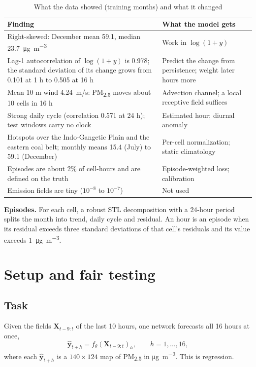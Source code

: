\documentclass[conference]{IEEEtran}
\newcommand{\ugm}{\si{\micro\gram\per\cubic\metre}}
\newcommand{\PM}{PM\textsubscript{2.5}}
\begin{document}
\begin{table}[!t]
\centering
\caption{What the data showed (training months) and what it changed}
\label{tab:eda}
\begin{tabular}{@{}p{}p{}@{}}
\toprule
Finding & What the model gets \\
\midrule
Right-skewed: December mean 59.1, median 23.7~\ugm & Work in $\log(1+y)$ \\
Lag-1 autocorrelation of $\log(1+y)$ is 0.978; the standard deviation of its change grows from 0.101 at 1 h to 0.505 at 16 h & Predict the change from persistence; weight later hours more \\
Mean 10-m wind 4.24~m/s: \PM{} moves about 10 cells in 16 h & Advection channel; a local receptive field suffices \\
Strong daily cycle (correlation 0.571 at 24 h); test windows carry no clock & Estimated hour; diurnal anomaly \\
Hotspots over the Indo-Gangetic Plain and the eastern coal belt; monthly means 15.4 (July) to 59.1 (December) & Per-cell normalization; static climatology \\
Episodes are about 2\% of cell-hours and are defined on the truth & Episode-weighted loss; calibration \\
Emission fields are tiny ($10^{-8}$ to $10^{-7}$) & Not used \\
\bottomrule
\end{tabular}
\end{table}

\textbf{Episodes.} For each cell, a robust STL decomposition \cite{cleveland1990} with a 24-hour period splits the month into trend, daily cycle and residual. An hour is an episode when its residual exceeds three standard deviations of that cell's residuals and its value exceeds 1~\ugm.

\section{Setup and fair testing}
\label{sec:setup}
\subsection{Task}
Given the fields $\mathbf{X}_{t-9:t}$ of the last 10 hours, one network forecasts all 16 hours at once,
\begin{equation}
\hat{\mathbf{y}}_{t+h} = f_\theta(\mathbf{X}_{t-9:t})_h, \qquad h = 1,\dots,16,
\end{equation}
where each $\hat{\mathbf{y}}_{t+h}$ is a $140\times124$ map of \PM{} in \ugm. This is regression.
\end{document}
